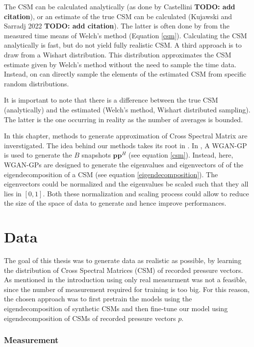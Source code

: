 \documentclass[11pt,a4paper,twoside]{report}
\begin{document}
The CSM can be calculated analytically (as done by Castellini \textbf{TODO: add citation}), or an estimate of the true CSM can be calculated (Kujawski and Sarradj 2022 \textbf{TODO: add citation}). The latter is often done by from the measured time means of Welch's method (Equation \ref{csm}). Calculating the CSM analytically is fast, but do not yield fully realistic CSM. A third approach is to draw from a Wishart distribution. This distribution approximates the CSM estimate given by Welch's method without the need to sample the time data. Instead, on can directly sample the elements of the estimated CSM from specific random distributions.

It is important to note that there is a difference between the true CSM (analytically) and the estimated (Welch's method, Wishart distributed sampling). The latter is the one occurring in reality as the number of averages is bounded.

In this chapter, methods to generate approximation of Cross Spectral Matrix are inverstigated. The idea behind our methods takes its root in \cite{gerstoft2020parametric}. In \cite{gerstoft2020parametric}, A WGAN-GP is used to generate the $B$ snapshots $\mathbf{p} \mathbf{p}^H$ (see equation \ref{csm}). Instead, here, WGAN-GPs are designed to generate the eigenvalues and eigenvectors of of the eigendecomposition of a CSM (see equation \ref{eigendecomposition}). The eigenvectors could be normalized and the eigenvalues be scaled such that they all lies in $[0,1]$. Both these normalization and scaling process could allow to reduce the size of the space of data to generate and hence improve performances.

\section{Data}

The goal of this thesis was to generate data as realistic as possible, by learning the distribution of Cross Spectral Matrices (CSM) of recorded pressure vectors. As mentioned in the introduction using only real measurment was not a feasible, since the number of measurement required for training is too big. For this reason, the chosen approach was to first pretrain the models using the eigendecomposition of synthetic CSMs and then fine-tune our model using eigendecomposition of CSMs of recorded pressure vectors $p$. 


\subsubsection{Measurement}
\end{document}
